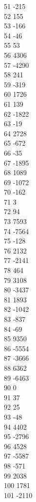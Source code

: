 { 51	-215 \\
 52	155 \\
 53	-166 \\
 54	-46 \\
 55	53 \\
 56	4306 \\
 57	-4290 \\
 58	241 \\
 59	-319 \\
 60	1726 \\
 61	139 \\
 62	-1822 \\
 63	-19 \\
 64	2728 \\
 65	-672 \\
 66	-35 \\
 67	-1895 \\
 68	1089 \\
 69	-1072 \\
 70	-162 \\
 71	3 \\
 72	94 \\
 73	7593 \\
 74	-7564 \\
 75	-128 \\
 76	2132 \\
 77	-2141 \\
 78	464 \\
 79	3108 \\
 80	-3437 \\
 81	1893 \\
 82	-1042 \\
 83	-837 \\
 84	-69 \\
 85	9350 \\
 86	-5554 \\
 87	-3666 \\
 88	6362 \\
 89	-6463 \\
 90	0 \\
 91	37 \\
 92	25 \\
 93	-48 \\
 94	4402 \\
 95	-2796 \\
 96	4528 \\
 97	-5587 \\
 98	-571 \\
 99	2038 \\
 100	1781 \\
 101	-2110 \\
}

